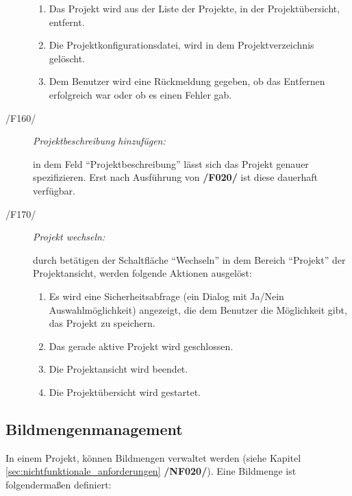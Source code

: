 \begin{description}
\begin{enumerate}
				\item Das Projekt wird aus der Liste der Projekte, in der Projektübersicht, entfernt.
				
				\item Die Projektkonfigurationsdatei, wird in dem Projektverzeichnis gelöscht.
				
				\item Dem Benutzer wird eine Rückmeldung gegeben, ob das Entfernen erfolgreich war oder ob es einen Fehler gab.
			
			\end{enumerate}
	
		\item[/F160/] \textit{Projektbeschreibung hinzufügen:}\par in dem Feld "`Projektbeschreibung"' lässt sich das Projekt genauer spezifizieren. Erst nach Ausführung von \textbf{/F020/} ist diese dauerhaft verfügbar.
	
		\item[/F170/] \textit{Projekt wechseln:}\par durch betätigen der Schaltfläche "`Wechseln"' in dem Bereich "`Projekt"' der Projektansicht, werden folgende Aktionen ausgelöst:
		\begin{enumerate}
				
				\item Es wird eine Sicherheitsabfrage (ein Dialog mit Ja/Nein Auswahlmöglichkeit) angezeigt, die dem Benutzer die Möglichkeit gibt, das Projekt zu speichern.
				
				\item Das gerade aktive Projekt wird geschlossen.
				
				\item Die Projektansicht wird beendet.
				
				\item Die Projektübersicht wird gestartet.
			
			\end{enumerate}
	
	\end{description}

\subsection{Bildmengenmanagement}

\label{subsec:bildmengenmgmt}
	
	In einem Projekt, können Bildmengen verwaltet werden (siehe Kapitel \ref{sec:nichtfunktionale_anforderungen} \textbf{/NF020/}). Eine Bildmenge ist folgendermaßen definiert:
	
